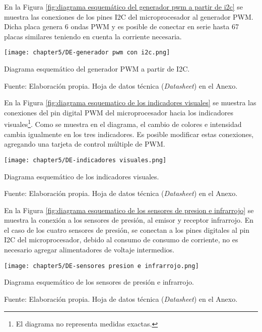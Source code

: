 En la Figura \ref{fig:diagrama esquemático del generador pwm a partir de i2c} se muestra las conexiones de los pines I2C del microprocesador al generador PWM. Dicha placa genera 6 ondas PWM y es posible de conectar en serie hasta 67 placas similares teniendo en cuenta la corriente necesaria.

\begin{myfigure}[H]
	\footnotesize\centering
	\texttt{[image: chapter5/DE-generador pwm con i2c.png]}
	\caption{Diagrama esquemático del generador PWM a partir de I2C.}
	\begin{myflushcenter}
		Fuente: Elaboración propia. Hoja de datos técnica (\textit{Datasheet}) en el Anexo.
	\end{myflushcenter}
	\label{fig:diagrama esquemático del generador pwm a partir de i2c}
\end{myfigure}

En la Figura \ref{fig:diagrama esquematico de los indicadores visuales} se muestra las conexiones del pin digital PWM del microprocesador hacia los indicadores visuales\footnote{El diagrama no representa medidas exactas.}. Como se muestra en el diagrama, el cambio de colores e intensidad cambia igualmente en los tres indicadores. Es posible modificar estas conexiones, agregando una tarjeta de control múltiple de PWM.

\begin{myfigure}[H]
	\footnotesize\centering
	\texttt{[image: chapter5/DE-indicadores visuales.png]}
	\caption{Diagrama esquemático de los indicadores visuales.}
	\begin{myflushcenter}
		Fuente: Elaboración propia. Hoja de datos técnica (\textit{Datasheet}) en el Anexo.
	\end{myflushcenter}
	\label{fig:diagrama esquematico de los indicadores visuales}
\end{myfigure}

En la Figura \ref{fig:diagrama esquematico de los sensores de presion e infrarrojo} se muestra la conexión a los sensores de presión, al emisor y receptor infrarrojo. En el caso de los cuatro sensores de presión, se conectan a los pines digitales al pin I2C del microprocesador, debido al consumo de consumo de corriente, no es necesario agregar alimentadores de voltaje intermedios.

\begin{myfigure}[H]
	\footnotesize\centering
	\texttt{[image: chapter5/DE-sensores presion e infrarrojo.png]}
	\caption{Diagrama esquemático de los sensores de presión e infrarrojo.}
	\begin{myflushcenter}
		Fuente: Elaboración propia. Hoja de datos técnica (\textit{Datasheet}) en el Anexo.
	\end{myflushcenter}
	\label{fig:diagrama esquematico de los sensores de presion e infrarrojo}
\end{myfigure}

